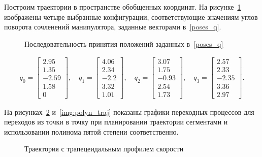Построим траектории в пространстве обобщенных координат. На рисунке~\ref{img:poses} изображены четыре выбранные конфигурации, соответствующие значениям углов поворота сочленений манипулятора, заданные векторами в~\eqref{poses_q}.
\begin{figure}[h!]
	\caption{Последовательность принятия положений заданных в~\ref{poses_q}}
	\vspace{0.5cm}
	\label{img:poses}
\end{figure}
\begin{gather}\label{poses_q}
	q_0 = 
	\begin{bmatrix}
	2.95 \\ 1.35 \\-2.59 \\1.58\\ 0
	\end{bmatrix}\!\!,\quad
	q_1 =
	\begin{bmatrix}
		 4.06 \\ 2.34\\ -2.2\\ 3.32\\ 1.01
	\end{bmatrix}\!\!,\quad
	q_2 = 
	\begin{bmatrix}
	3.07 \\1.75\\ -0.93 \\2.54\\ 1.73
	\end{bmatrix}\!\!,\quad
	q_3 = 
	\begin{bmatrix}
	2.57\\ 2.33\\ -2.35\\ 3.36\\ 2.97
	\end{bmatrix}\!\!.
\end{gather}

На рисунках~\ref{img:segments_traj} и~\ref{img:polyn_traj} показаны графики переходных процессов для переходов из точки в точку при планировании траектории сегментами и использовании полинома пятой степени соответственно.

\begin{figure}[h!]
	\vspace{0.2cm}
	\caption{Траектория с трапецеидальным профилем скорости}
	\label{img:segments_traj}
\end{figure}

